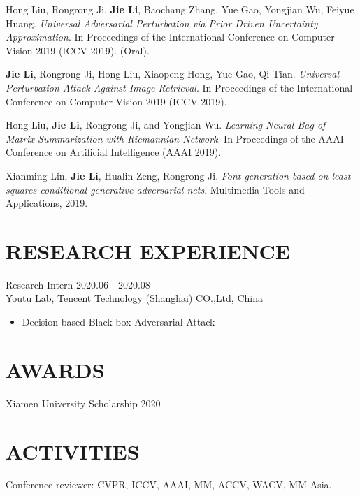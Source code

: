 \documentclass[margin, 10pt]{res} %
\begin{document}
\begin{resume}
Hong Liu, Rongrong Ji, \textbf{Jie Li}, Baochang Zhang, Yue Gao, Yongjian Wu, Feiyue Huang. \textit{Universal Adversarial Perturbation via Prior Driven Uncertainty Approximation}.
In Proceedings of the International Conference on Computer Vision 2019 (ICCV 2019). (Oral).

\textbf{Jie Li}, Rongrong Ji, Hong Liu, Xiaopeng Hong, Yue Gao, Qi Tian. \textit{Universal Perturbation Attack Against Image Retrieval}.
In Proceedings of the International Conference on Computer Vision 2019 (ICCV 2019).

Hong Liu, \textbf{Jie Li}, Rongrong Ji, and Yongjian Wu. \textit{Learning Neural Bag-of-Matrix-Summarization with Riemannian Network}.
In Proceedings of the AAAI Conference on Artificial Intelligence (AAAI 2019).

Xianming Lin, \textbf{Jie Li}, Hualin Zeng, Rongrong Ji. \textit{Font generation based on least squares conditional generative adversarial nets}.
Multimedia Tools and Applications, 2019.

\section{RESEARCH EXPERIENCE}
Research Intern \hfill 2020.06 - 2020.08 \\
Youtu Lab, Tencent Technology (Shanghai) CO.,Ltd, China
\begin{itemize}
    \item Decision-based Black-box Adversarial Attack
\end{itemize}

\section{AWARDS}
Xiamen University Scholarship \hfill 2020

\section{ACTIVITIES}
Conference reviewer: CVPR, ICCV, AAAI, MM, ACCV, WACV, MM Asia.

\end{resume}
\end{document}
